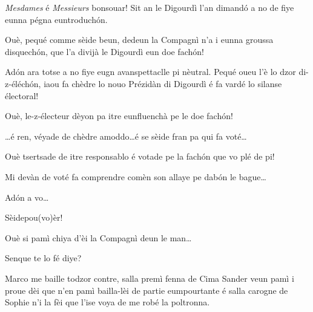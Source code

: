 \begin{drama}

\Aimespeaks \textit{Mesdames} é \textit{Messieurs} bonsouar! Sit an le Digourdì l’an dimand\'o a no de fiye eunna pégna euntroduch\'on.

\Juliespeaks Ouè, pequé comme sèide beun, dedeun la Compagnì n’a i eunna groussa disquech\'on, que l'a divijà le Digourdì eun doe fach\'on!

\Aimespeaks Ad\'on ara totse a no fiye eugn avanspettaclle pi nèutral.  Pequé oueu l’è lo dzor di-z-éléch\'on, iaou fa chèdre lo nouo Prézidàn di Digourdì é fa vardé lo silanse électoral!

\Juliespeaks Ouè, le-z-électeur dèyon pa itre eunfluenchà pe le doe fach\'on! 


\Aimespeaks {} \ldots é ren, véyade de chèdre amoddo\ldots é se sèide fran pa qui fa voté\ldots 


\Juliespeaks Ouè tsertsade de itre responsablo é votade pe la fach\'on  que vo plé de pi!

\Aimespeaks Mi devàn de voté fa comprendre comèn son allaye pe dab\'on le bague\ldots

\Juliespeaks Ad\'on a vo\ldots

\Tcheuttedouspeaks Sèidepou(vo)èr!

\act[Acte I]

\ridoiver





\Presidanspeaks {}
Ouè si pamì chiya d'èi la Compagnì
deun le man\ldots

\Secreteospeaks Senque te lo fé diye?

\Presidanspeaks Marco me baille todzor contre, salla premì fenna de Cima Sander veun pamì i proue dèi que n’en pamì bailla-lèi de partie eumpourtante é salla carogne de Sophie n'i la fèi que l'ise voya de me robé la poltronna.


\end{drama}
